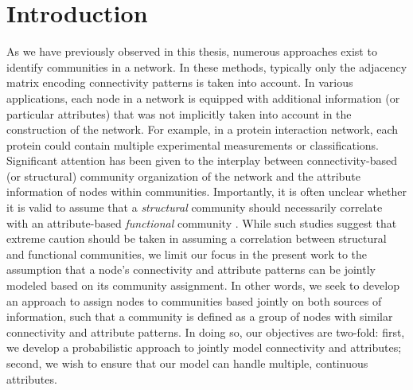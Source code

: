 \section{Introduction}
As we have previously observed in this thesis, numerous approaches exist to identify communities in a network. In these methods, typically only the adjacency matrix encoding connectivity patterns is taken into account. In various applications, each node in a network is equipped with additional information (or particular attributes) that was not implicitly taken into account in the construction of the network. For example, in a protein interaction network, each protein could contain multiple experimental measurements or classifications. Significant attention has been given to the interplay between connectivity-based (or structural) community organization of the network and the attribute information of nodes within communities. Importantly, it is often unclear whether it is valid to assume that a \emph{structural} community should necessarily correlate with an attribute-based \emph{functional} community \cite{hric,peel2017ground,jureTruth}. While such studies suggest that extreme caution should be taken in assuming a correlation between structural and functional communities, we limit our focus in the present work to the assumption that a node's connectivity and attribute patterns can be jointly modeled based on its community assignment. In other words, we seek to develop an approach to assign nodes to communities based jointly on both sources of information, such that a community is defined as a group of nodes with similar connectivity and attribute patterns. In doing so, our objectives are two-fold: first, we develop a probabilistic approach to jointly model connectivity and attributes; second, we wish to ensure that our model can handle multiple, continuous attributes.  

